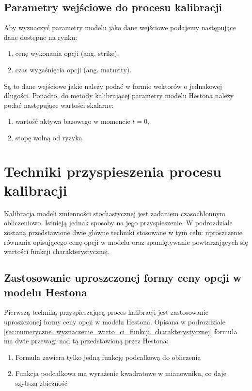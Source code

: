 \documentclass{pracamgr}
\begin{document}
\subsection{Parametry wejściowe do procesu kalibracji}

Aby wyznaczyć parametry modelu jako dane wejściowe podajemy następujące dane dostępne na rynku:
\begin{enumerate}
  \item cenę wykonania opcji (ang. strike),
  \item czas wygaśnięcia opcji (ang. maturity).
\end{enumerate}
Są to dane wejściowe jakie należy podać w formie wektorów o jednakowej długości.
Ponadto, do metody kalibrującej parametry modelu Hestona należy podać następujące 
wartości skalarne:
\begin{enumerate}
  \item wartość aktywa bazowego w momencie $t=0$,
  \item stopę wolną od ryzyka.
\end{enumerate}

\section{Techniki przyspieszenia procesu kalibracji} %
Kalibracja modeli zmienności stochastycznej jest zadaniem czasochłonnym obliczeniowo. 
Istnieją jednak sposoby na jego przyspieszenie. W podrozdziale zostaną przedstawione 
dwie główne techniki stosowane w tym celu: uproszczenie równania opisującego cenę opcji 
w modelu oraz spamiętywanie powtarzających się wartości funkcji charakterystycznej.


\subsection{Zastosowanie uproszczonej formy ceny opcji w modelu Hestona} %
\label{sec:uproszczona_forma}

Pierwszą techniką przyspieszającą proces kalibracji jest zastosowanie uproszczonej formy ceny opcji w 
modelu Hestona. 
Opisana w podrozdziale \ref{sec:numeryczne_wyznaczenie_warto_ci_funkcji_charakterystycznej} 
formuła ma dwie przewagi nad tą przedstawioną przez Hestona:
\begin{enumerate}
  \item Formuła zawiera tylko jedną funkcję podcałkową do obliczenia
  \item Funkcja podcałkowa ma wyrażenie kwadratowe w mianowniku, co daje szybszą zbieżność  \cite{Attari}
\end{enumerate}
\end{document}
